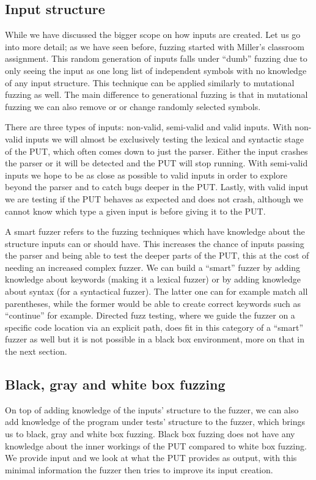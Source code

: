 \subsection{Input structure}
\label{fuzzing:InputStructure}
While we have discussed the bigger scope on how inputs are created. Let us go into more detail; as we have seen before, fuzzing started with Miller’s classroom assignment. This random generation of inputs falls under “dumb” fuzzing due to only seeing the input as one long list of independent symbols with no knowledge of any input structure. This technique can be applied similarly to mutational fuzzing as well. The main difference to generational fuzzing is that in mutational fuzzing we can also remove or or change randomly selected symbols. 

There are three types of inputs: non-valid, semi-valid and valid inputs. With non-valid inputs we will almost be exclusively testing the lexical and syntactic stage of the PUT, which often comes down to just the parser. Either the input crashes the parser or it will be detected and the PUT will stop running. With semi-valid inputs we hope to be as close as possible to valid inputs in order to explore beyond the parser and to catch bugs deeper in the PUT. Lastly, with valid input we are testing if the PUT behaves as expected and does not crash, although we cannot know which type a given input is before giving it to the PUT.

A smart fuzzer refers to the fuzzing techniques which have knowledge about the structure inputs can or should have. This increases the chance of inputs passing the parser and being able to test the deeper parts of the PUT, this at the cost of needing an increased complex fuzzer. We can build a “smart” fuzzer by adding knowledge about keywords (making it a lexical fuzzer) or by adding knowledge about syntax (for a syntactical fuzzer). The latter one can for example match all parentheses, while the former would be able to create correct keywords such as “continue” for example. Directed fuzz testing, where we guide the fuzzer on a specific code location via an explicit path, does fit in this category of a “smart” fuzzer as well but it is not possible in a black box environment, more on that in the next section.

\subsection{Black, gray and white box fuzzing}
\label{fuzzing:BlackGrayWhiteFuzzing}
On top of adding knowledge of the inputs’ structure to the fuzzer, we can also add knowledge of the program under tests’ structure to the fuzzer, which brings us to black, gray and white box fuzzing. Black box fuzzing does not have any knowledge about the inner workings of the PUT compared to white box fuzzing. We provide input and we look at what the PUT provides as output, with this minimal information the fuzzer then tries to improve its input creation. 

